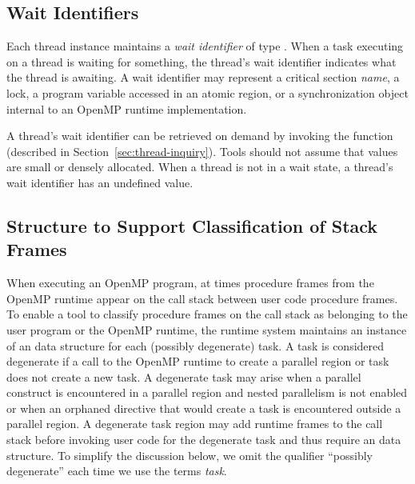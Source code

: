 \documentclass{article}
\begin{document}
\subsection{Wait Identifiers}
Each thread instance maintains a {\em wait identifier} of type . 
When a task executing on a thread is waiting for something, the thread's wait identifier indicates what the thread is awaiting. 
A wait identifier may represent a critical section {\em name}, a lock,  a program variable accessed in an atomic region, or a synchronization object internal to an OpenMP runtime implementation. 

A thread's wait identifier can be retrieved on demand by invoking the  function (described in Section~\ref{sec:thread-inquiry}).
Tools should not assume that  values are small or densely allocated. 
When a thread is not in a wait state, a thread's wait identifier has an undefined value.
 
\subsection{Structure to Support Classification of Stack Frames}

  When executing an OpenMP program, at times procedure frames from the OpenMP runtime appear on the call stack between user code procedure frames.
  To enable a tool to classify procedure frames on the call stack as belonging to the user program or the OpenMP runtime,
  the runtime system maintains an instance of an  data structure 
  for each (possibly degenerate) task. A task is considered degenerate if a call to the OpenMP runtime to create a parallel 
  region or task does not create a new task. A degenerate task may arise when a parallel construct is encountered
   in a parallel region and nested parallelism is not enabled or when an orphaned directive that would create a task is encountered outside a parallel region.
  A degenerate task region may add runtime frames to the call stack before 
  invoking user code for the degenerate task and thus require an  data structure. 
  To simplify the discussion below, we omit the qualifier ``possibly degenerate'' each time we use the terms {\em task}.
\end{document}
